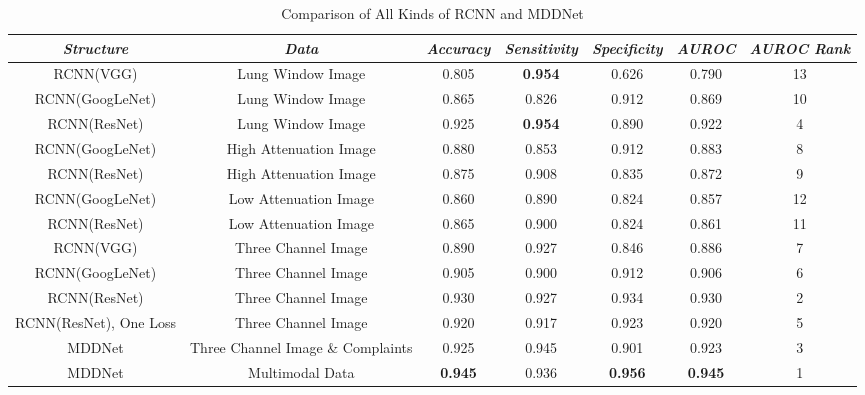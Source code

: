 \documentclass[journal]{IEEEtran}
\begin{document}
\begin{table}[htb]
    \vspace{-0cm}
    \caption{Comparison of All Kinds of RCNN and MDDNet}
    \vspace{-0cm}
    \begin{center}
    \begin{tabular}{|c|c|c|c|c|c|c|}
    \hline
    \textbf{\textit{Structure}} & \textbf{\textit{Data}}& \textbf{\textit{Accuracy}}  & \textbf{\textit{Sensitivity}} & \textbf{\textit{Specificity}} & \textbf{\textit{AUROC}}& \textbf{\textit{AUROC Rank}}\\
    \hline
    RCNN(VGG) & Lung Window Image & 0.805 & {\bfseries 0.954} &0.626 &0.790 &13\\
    RCNN(GoogLeNet) & Lung Window Image& 0.865 & 0.826 & 0.912 & 0.869 &10\\
    RCNN(ResNet) & Lung Window Image & 0.925 & {\bfseries 0.954} & 0.890 & 0.922 &4\\
    RCNN(GoogLeNet) & High Attenuation Image& 0.880 & 0.853 & 0.912 & 0.883 &8\\
    RCNN(ResNet)& High Attenuation Image& 0.875 & 0.908 & 0.835 & 0.872 &9\\
    RCNN(GoogLeNet) & Low Attenuation Image& 0.860 & 0.890 & 0.824 & 0.857 &12\\
    RCNN(ResNet) & Low Attenuation Image& 0.865 & 0.900 & 0.824 & 0.861 &11\\
    RCNN(VGG) & Three Channel Image& 0.890 & 0.927 &0.846 &0.886 &7\\
    RCNN(GoogLeNet)& Three Channel Image & 0.905 & 0.900 & 0.912 & 0.906 &6\\
    RCNN(ResNet) & Three Channel Image& 0.930 & 0.927 & 0.934 & 0.930 &2\\
    RCNN(ResNet), One Loss & Three Channel Image& 0.920 & 0.917 & 0.923 & 0.920 &5\\
    MDDNet & Three Channel Image \& Complaints & 0.925 & 0.945 & 0.901 & 0.923 &3\\
    MDDNet & Multimodal Data&  {\bfseries 0.945} & 0.936 & {\bfseries 0.956} & {\bfseries 0.945} &1\\
    \hline
    \end{tabular}
    \vspace{-0cm}
    \label{comparison}
    \end{center}
    \vspace{-0cm}
    \end{table}
\end{document}

